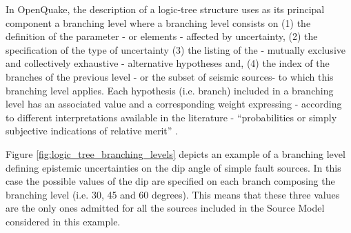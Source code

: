 %
In OpenQuake, the description of a logic-tree structure uses as its principal 
component a branching level where a branching level consists on (1) the 
definition of the parameter - or elements - affected by uncertainty, (2) the 
specification of the type of uncertainty (3) the listing of the - mutually 
exclusive and collectively exhaustive \citep{bommer2008} - alternative 
hypotheses and, (4) the index of the branches of the previous level - or the subset of seismic sources- to which this branching level applies.
%
Each hypothesis (i.e. branch) included in a branching level has an associated value and a corresponding weight expressing - according to different interpretations available in the literature - ``probabilities or simply subjective indications of relative merit'' \citep[][page 999]{bommer2008}.

Figure \ref{fig:logic_tree_branching_levels} depicts an example of a branching level defining epistemic uncertainties on the dip angle of simple 
fault sources. In this case the possible values of the dip are specified
on each branch composing the branching level (i.e. 30, 45 and 60 degrees). This 
means that these three values are the only ones admitted for all the sources 
included in the Source Model considered in this example. 

